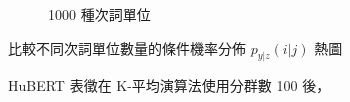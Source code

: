 {{\begin{figure}
\begin{subfigure}{\textwidth}
                 \caption{1000 種次詞單位}
                 \label{fig:hub-u100-ap1000-givenunit-byphn}
             \end{subfigure}

             \caption{HuBERT 表徵在 K-平均演算法使用分群數 100 後，}
             比較不同次詞單位數量的條件機率分佈 $p_{y|z}(i | j)$ 熱圖
             \label{fig:hub-u100-comparisons}
        \end{figure}
    }
}
